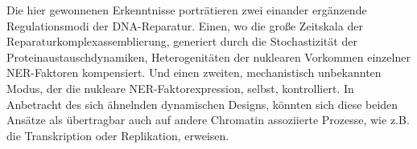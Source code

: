 Die hier gewonnenen Erkenntnisse portr\"{a}tieren zwei einander erg\"{a}nzende Regulationsmodi der DNA-Reparatur. Einen, wo die gro\ss{}e Zeitskala der Reparaturkomplexassemblierung, generiert durch die Stochastizit\"{a}t der Proteinaustauschdynamiken, Heterogenit\"{a}ten der nu\-klearen Vorkommen einzelner NER-Faktoren kompensiert. Und einen zweiten, mechanistisch unbekannten Modus, der die nukleare NER-Faktorexpression, selbst, kontrolliert. In Anbetracht des sich \"{a}hnelnden dynamischen Designs, k\"{o}nnten sich diese beiden Ans\"{a}tze als \"{u}bertragbar auch auf andere Chromatin assoziierte Prozesse, wie z.B. die Transkription oder Replikation, erweisen.  


  




